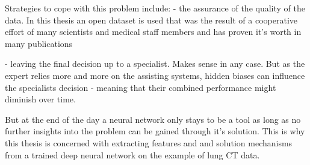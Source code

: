\documentclass[main.tex]{subfiles}
\begin{document}
Strategies to cope with this problem include:
- the assurance of the quality of the data. In this thesis an open dataset is used that was
the result of a cooperative effort of many scientists and medical staff members and has proven
it's worth in many publications

- leaving the final decision up to a specialist. Makes sense in any case. But as the expert relies more and more
on the assisting systems, hidden biases can influence the specialists decision - meaning that their combined
performance might diminish over time.

But at the end of the day a neural network only stays to be a tool as long as no further insights into
the problem can be gained through it's solution. This is why this thesis is concerned with extracting
features and and solution mechanisms from a trained deep neural network on the example of lung CT data.
\end{document}
